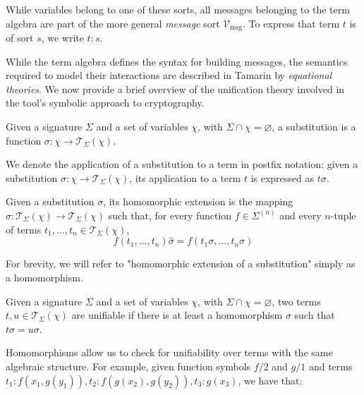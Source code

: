 \noindent While variables belong to one of these sorts, all messages belonging to the term algebra are part of the more general \textit{message} sort $\mathcal{V}_\text{msg}$. To express that term $t$ is of sort $s$, we write $t:s$.

While the term algebra defines the syntax for building messages, the semantics required to model their interactions are described in Tamarin by \textit{equational theories}. We now provide a brief overview of the unification theory involved in the tool's symbolic approach to cryptography.

\begin{definition}[Substitution]
    Given a signature $\Sigma$ and a set of variables $\chi$, with $\Sigma \cap \chi = \varnothing$, a substitution is a function $\sigma: \chi \rightarrow \mathcal{T}_{\Sigma}(\chi)$.
\end{definition}

We denote the application of a substitution to a term in postfix notation: given a substitution $\sigma : \chi \to \mathcal{T}_{\Sigma}(\chi)$, its application to a term $t$ is expressed as $t \sigma$.

\begin{definition}
    Given a substitution $\sigma$, its homomorphic extension is the mapping $\hat{\sigma}:\mathcal{T}_{\Sigma}(\chi) \to \mathcal{T}_{\Sigma}(\chi)$ such that, for every function $f \in \Sigma^{(n)}$ and every $n$-tuple of terms $t_1, ..., t_n \in \mathcal{T}_{\Sigma}(\chi)$,
    \begin{equation*}
        f(t_1,...,t_n)\hat{\sigma} = f(t_1\sigma,...,t_n\sigma)
    \end{equation*}
\end{definition}
For brevity, we will refer to "homomorphic extension of a substitution" simply as a homomorphism.

\begin{definition}[Unifiability]
    Given a signature $\Sigma$ and a set of variables $\chi$, with $\Sigma \cap \chi = \varnothing$, two terms $t,u \in \mathcal{T}_{\Sigma}(\chi)$ are unifiable if there is at least a homomorphism $\sigma$ such that $t\sigma = u\sigma$.
\end{definition}

Homomorphisms allow us to check for unifiability over terms with the same algebraic structure. For example, given function symbols $f/2$ and $g/1$ and terms $t_1: f(x_1,g(y_1)), t_2: f(g(x_2),g(y_2)), t_3: g(x_3)$, we have that:


